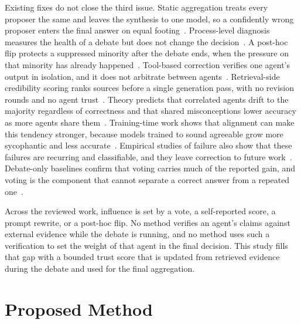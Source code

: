 \documentclass[a4paper,fleqn]{cas-sc}
\begin{document}
Existing fixes do not close the third issue. Static aggregation treats every proposer the same and leaves the synthesis to one model, so a confidently wrong proposer enters the final answer on equal footing~\cite{wang2025mixture}. Process-level diagnosis measures the health of a debate but does not change the decision~\cite{pitre2026diagnostic}. A post-hoc flip protects a suppressed minority after the debate ends, when the pressure on that minority has already happened~\cite{he2026minority}. Tool-based correction verifies one agent's output in isolation, and it does not arbitrate between agents~\cite{gou2024critic}. Retrieval-side credibility scoring ranks sources before a single generation pass, with no revision rounds and no agent trust~\cite{kushwaha2026agentbased}. Theory predicts that correlated agents drift to the majority regardless of correctness and that shared misconceptions lower accuracy as more agents share them~\cite{estornell2024multillm}. Training-time work shows that alignment can make this tendency stronger, because models trained to sound agreeable grow more sycophantic and less accurate~\cite{ibrahim2026training,chen2025self}. Empirical studies of failure also show that these failures are recurring and classifiable, and they leave correction to future work~\cite{cemri2025why}. Debate-only baselines confirm that voting carries much of the reported gain, and voting is the component that cannot separate a correct answer from a repeated one~\cite{choi2025debate}.

Across the reviewed work, influence is set by a vote, a self-reported score, a prompt rewrite, or a post-hoc flip. No method verifies an agent's claims against external evidence while the debate is running, and no method uses such a verification to set the weight of that agent in the final decision. This study fills that gap with a bounded trust score that is updated from retrieved evidence during the debate and used for the final aggregation.

\section{Proposed Method}\label{sec3}
\end{document}
